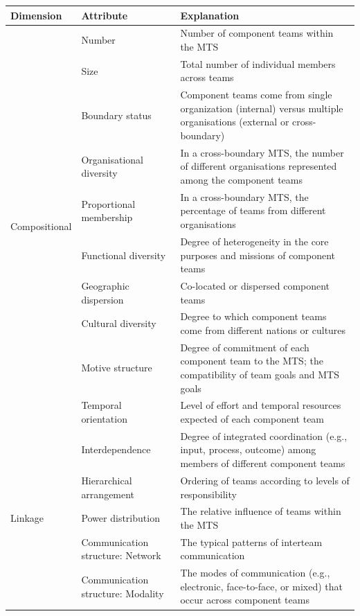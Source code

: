 \begin{table}[H]
\begin{adjustwidth}{-1.15cm}{}
\begin{tabular}{ | p{2.7cm} | p{5cm} | p{9cm} | }
	\hline
	\textbf{Dimension} & \textbf{Attribute} & \textbf{Explanation} \\ \hline
	\multirow{10}{*}{Compositional} & Number & Number of component teams within the MTS \\ \cline{2-3}
 	& Size & Total number of individual members across teams \\ \cline{2-3}
 	& Boundary status & Component teams come from single organization (internal) versus multiple organisations (external or cross-boundary) \\ \cline{2-3}
 	& Organisational diversity & In a cross-boundary MTS, the number of different organisations represented among the component teams \\ \cline{2-3}
	& Proportional membership & In a cross-boundary MTS, the percentage of teams from different organisations \\ \cline{2-3}
	& Functional diversity & Degree of heterogeneity in the core purposes and missions of component teams \\ \cline{2-3}
	& Geographic dispersion & Co-located or dispersed component teams \\ \cline{2-3}
	& Cultural diversity & Degree to which component teams come from different nations or cultures \\ \cline{2-3}
	& Motive structure & Degree of commitment of each component team to the MTS; the compatibility of team goals and MTS goals \\ \cline{2-3}
	& Temporal orientation & Level of effort and temporal resources expected of each component team \\ \cline{2-3}
\hline
	\multirow{5}{*}{Linkage} & Interdependence & Degree of integrated coordination (e.g., input, process, outcome) among members of different component teams \\ \cline{2-3}
 	& Hierarchical arrangement & Ordering of teams according to levels of responsibility \\ \cline{2-3}
 	& Power distribution & The relative influence of teams within the MTS \\ \cline{2-3}
	& Communication structure: Network & The typical patterns of interteam communication \\ \cline{2-3}
	& Communication structure: Modality & The modes of communication (e.g., electronic, face-to-face, or mixed) that occur across component teams \\ \cline{2-3}

\end{tabular}
\end{adjustwidth}
\end{table}
